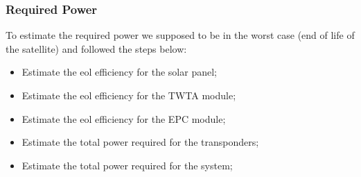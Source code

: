 \subsubsection{Required Power}
	To estimate the required power we supposed to be in the worst case (end of life of the satellite) and followed the steps below:
\begin{itemize}
\item Estimate the \gls{eol} efficiency for the solar panel;
\item Estimate the \gls{eol} efficiency for the TWTA module;
\item Estimate the \gls{eol} efficiency for the EPC module;
\item Estimate the total power required for the transponders;
\item Estimate the total power required for the system;
\end{itemize}

